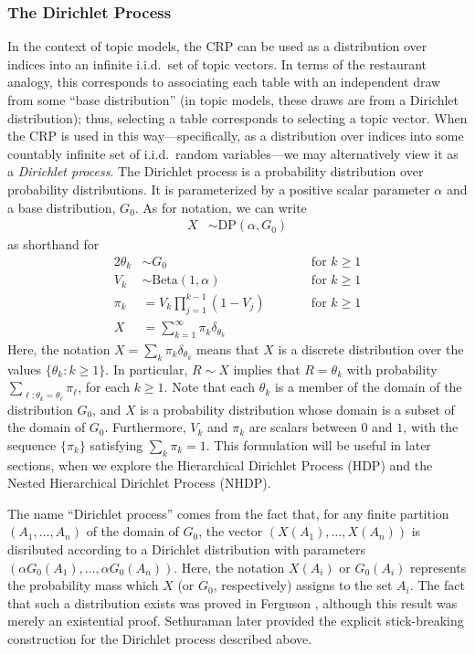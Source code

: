 \documentclass{article}
\begin{document}
\subsubsection{The Dirichlet Process}

In the context of topic models, the CRP can be used as a distribution over indices into an infinite i.i.d.\ set of topic vectors.
In terms of the restaurant analogy, this corresponds to associating each table with an independent draw from some ``base distribution'' (in topic models, these draws are from a Dirichlet distribution); thus, selecting a table corresponds to selecting a topic vector.
When the CRP is used in this way---specifically, as a distribution over indices into some countably infinite set of i.i.d.\ random variables---we may alternatively view it as a \emph{Dirichlet process}.
The Dirichlet process is a probability distribution over probability distributions.
It is parameterized by a positive scalar parameter $\alpha$ and a base distribution, $G_0$.
As for notation, we can write
\begin{align}
X &\sim \text{DP}(\alpha, G_0)
\end{align}
as shorthand for
\begin{alignat}{2}
\theta_k &\sim G_0 &\qquad& \text{for $k \geq 1$} \\
V_k &\sim \text{Beta}(1, \alpha) &\qquad& \text{for $k \geq 1$} \\
\pi_k &= V_k \prod_{j=1}^{k-1} (1 - V_j) &\qquad& \text{for $k \geq 1$} \\
X &= \sum_{k=1}^\infty \pi_k \delta_{\theta_k} &&
\end{alignat}
Here, the notation $X = \sum_k \pi_k \delta_{\theta_k}$ means that $X$ is a discrete distribution over the values $\{\theta_k : k \geq 1\}$.
In particular, $R \sim X$ implies that $R = \theta_k$ with probability $\sum_{\ell : \theta_k = \theta_\ell} \pi_\ell$, for each $k \geq 1$.
Note that each $\theta_k$ is a member of the domain of the distribution $G_0$, and $X$ is a probability distribution whose domain is a subset of the domain of $G_0$.
Furthermore, $V_k$ and $\pi_k$ are scalars between $0$ and $1$, with the sequence $\{\pi_k\}$ satisfying $\sum_k \pi_k = 1$.
This formulation will be useful in later sections, when we explore the Hierarchical Dirichlet Process (HDP) and the Nested Hierarchical Dirichlet Process (NHDP).

The name ``Dirichlet process'' comes from the fact that, for any finite partition $(A_1, \ldots, A_n)$ of the domain of $G_0$, the vector $(X(A_1), \ldots, X(A_n))$ is disributed according to a Dirichlet distribution with parameters $(\alpha G_0(A_1), \ldots, \alpha G_0(A_n))$.
Here, the notation $X(A_i)$ or $G_0(A_i)$ represents the probability mass which $X$ (or $G_0$, respectively) assigns to the set $A_i$.
The fact that such a distribution exists was proved in Ferguson \cite{ferguson1973bayesian}, although this result was merely an existential proof.
Sethuraman \cite{sethuraman1994constructive} later provided the explicit stick-breaking construction for the Dirichlet process described above.
\end{document}
